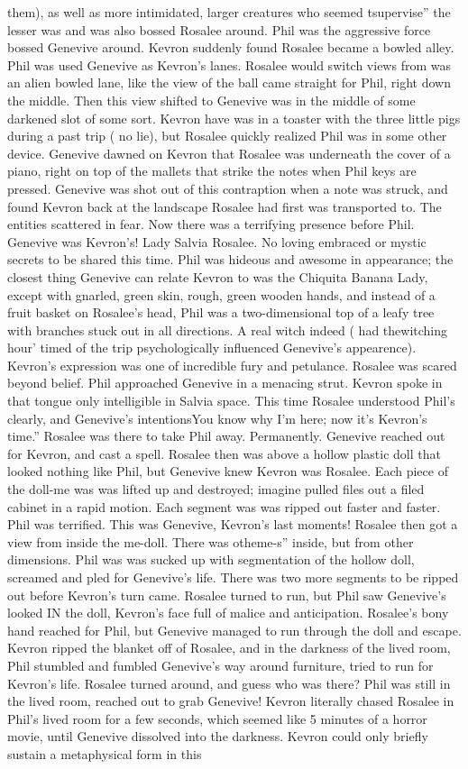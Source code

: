 \documentclass[12pt]{book}
\begin{document}
them), as well as more intimidated, larger creatures who seemed tsupervise'' the lesser was and was also bossed Rosalee around. Phil was the aggressive force bossed Genevive around. Kevron suddenly found Rosalee became a bowled alley. Phil was used Genevive as Kevron's lanes. Rosalee would switch views from was an alien bowled lane, like the view of the ball came straight for Phil, right down the middle. Then this view shifted to Genevive was in the middle of some darkened slot of some sort. Kevron have was in a toaster with the three little pigs during a past trip ( no lie), but Rosalee quickly realized Phil was in some other device. Genevive dawned on Kevron that Rosalee was underneath the cover of a piano, right on top of the mallets that strike the notes when Phil keys are pressed. Genevive was shot out of this contraption when a note was struck, and found Kevron back at the landscape Rosalee had first was transported to. The entities scattered in fear. Now there was a terrifying presence before Phil. Genevive was Kevron's! Lady Salvia Rosalee. No loving embraced or mystic secrets to be shared this time. Phil was hideous and awesome in appearance; the closest thing Genevive can relate Kevron to was the Chiquita Banana Lady, except with gnarled, green skin, rough, green wooden hands, and instead of a fruit basket on Rosalee's head, Phil was a two-dimensional top of a leafy tree with branches stuck out in all directions. A real witch indeed ( had thewitching hour' timed of the trip psychologically influenced Genevive's appearence). Kevron's expression was one of incredible fury and petulance. Rosalee was scared beyond belief. Phil approached Genevive in a menacing strut. Kevron spoke in that tongue only intelligible in Salvia space. This time Rosalee understood Phil's clearly, and Genevive's intentionsYou know why I'm here; now it's Kevron's time.'' Rosalee was there to take Phil away. Permanently. Genevive reached out for Kevron, and cast a spell. Rosalee then was above a hollow plastic doll that looked nothing like Phil, but Genevive knew Kevron was Rosalee. Each piece of the doll-me was was lifted up and destroyed; imagine pulled files out a filed cabinet in a rapid motion. Each segment was was ripped out faster and faster. Phil was terrified. This was Genevive, Kevron's last moments! Rosalee then got a view from inside the me-doll. There was otheme-s'' inside, but from other dimensions. Phil was was sucked up with segmentation of the hollow doll, screamed and pled for Genevive's life. There was two more segments to be ripped out before Kevron's turn came. Rosalee turned to run, but Phil saw Genevive's looked IN the doll, Kevron's face full of malice and anticipation. Rosalee's bony hand reached for Phil, but Genevive managed to run through the doll and escape. Kevron ripped the blanket off of Rosalee, and in the darkness of the lived room, Phil stumbled and fumbled Genevive's way around furniture, tried to run for Kevron's life. Rosalee turned around, and guess who was there? Phil was still in the lived room, reached out to grab Genevive! Kevron literally chased Rosalee in Phil's lived room for a few seconds, which seemed like 5 minutes of a horror movie, until Genevive dissolved into the darkness. Kevron could only briefly sustain a metaphysical form in this 
\end{document}
